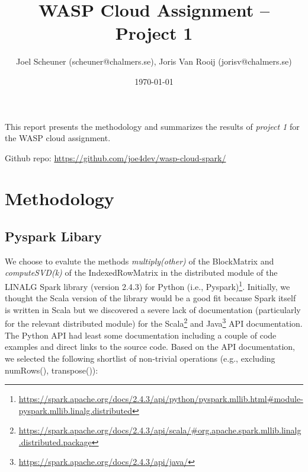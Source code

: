 \documentclass{prog_report}
\newcommand{\footurl}[1]{\footnote{\url{#1}}}
\begin{document}
\title{WASP Cloud Assignment – Project 1}

\author{Joel Scheuner (scheuner@chalmers.se), Joris Van Rooij (jorisv@chalmers.se)}

\date{\today}

\maketitle

%

This report presents the methodology and summarizes the results of \emph{project 1} for the WASP cloud assignment.

Github repo: \url{https://github.com/joe4dev/wasp-cloud-spark/}

\section{Methodology}

\subsection{Pyspark Libary}
We choose to evalute the methods \emph{multiply(other)} of the BlockMatrix and \emph{computeSVD(k)} of the IndexedRowMatrix in the distributed module of the LINALG Spark library (version 2.4.3) for Python (i.e., Pyspark)\footurl{https://spark.apache.org/docs/2.4.3/api/python/pyspark.mllib.html\#module-pyspark.mllib.linalg.distributed}.
Initially, we thought the Scala version of the library would be a good fit because Spark itself is written in Scala but we discovered a severe lack of documentation (particularly for the relevant distributed module) for the Scala\footurl{https://spark.apache.org/docs/2.4.3/api/scala/\#org.apache.spark.mllib.linalg.distributed.package} and Java\footurl{https://spark.apache.org/docs/2.4.3/api/java/} API documentation.
The Python API had least some documentation including a couple of code examples and direct links to the source code.
Based on the API documentation, we selected the following shortlist of non-trivial operations (e.g., excluding numRows(), transpose()):
\end{document}
